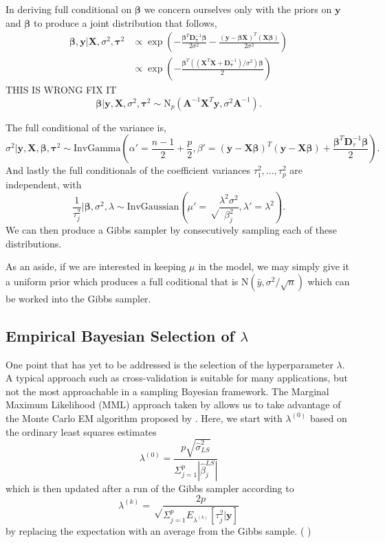 \documentclass{uwstat572}
\newcommand{\vmcomment}[1]{({\color{blue}{VM's comment:}} \textbf{\color{blue}{#1}})}
\begin{document}
In deriving full conditional on $\boldsymbol\beta$ we concern ourselves only with the priors on $\mathbf{y}$ and $\boldsymbol\beta$ to produce a joint distribution that follows,\begin{align*}
\boldsymbol\beta,\mathbf{y}|\mathbf{X},\sigma^2,\boldsymbol\tau^2 &\propto \exp{\left(-\frac{\boldsymbol\beta^T\mathbf{D}_{\boldsymbol\tau}^{-1}\boldsymbol\beta}{2\sigma^2}-\frac{(\mathbf{y}-\boldsymbol\beta\mathbf{X})^T(\mathbf{X}\boldsymbol\beta)}{2\sigma^2}\right)}\\
&\propto \exp{\left(-\frac{\boldsymbol\beta^T((\mathbf{X}^T\mathbf{X}+\mathbf{D}_{\boldsymbol\tau}^{-1})/\sigma^2)\boldsymbol\beta}{2}\right)}
\end{align*}
THIS IS WRONG FIX IT
\[
\boldsymbol\beta|\mathbf{y},\mathbf{X},\sigma^2,\boldsymbol\tau^2 \sim \text{N}_p(\mathbf{A}^{-1}\mathbf{X}^T\mathbf{y},\sigma^2\mathbf{A}^{-1}). \] 

The full conditional of the variance is, \[ \sigma^2|\mathbf{y},\mathbf{X},\boldsymbol\beta,\boldsymbol\tau^2 \sim \text{InvGamma}\left(\alpha'=\frac{n-1}{2}+\frac{p}{2},\beta'=(\mathbf{y}-\mathbf{X}\boldsymbol\beta)^T(\mathbf{y}-\mathbf{X}\boldsymbol\beta)+\frac{\boldsymbol\beta^T\mathbf{D}_\tau^{-1}\boldsymbol\beta}{2}\right). \] And lastly the full conditionals of the coefficient variances $\tau^2_1,...,\tau^2_p$ are independent, with \[
\frac{1}{\tau_j^2} | \boldsymbol\beta, \sigma^2, \lambda \sim \text{InvGaussian}\left(\mu'=\sqrt\frac{\lambda^2\sigma^2}{\beta_j^2}, \lambda'=\lambda^2\right). \] We can then produce a Gibbs sampler by consecutively sampling each of these distributions.

As an aside, if we are interested in keeping $\mu$ in the model, we may simply give it a uniform prior which produces a full coditional that is $\text{N}(\bar{y},\sigma^2/\sqrt{n})$ which can be worked into the Gibbs sampler.

\subsection{Empirical Bayesian Selection of $\lambda$}
One point that has yet to be addressed is the selection of the hyperparameter $\lambda$. A typical approach such as cross-validation is suitable for many applications, but not the most approachable in a sampling Bayesian framework. The Marginal Maximum Likelihood (MML) approach taken by \cite{park2008bayesian} allows us to take advantage of the Monte Carlo EM algorithm proposed by \cite{casella2001empirical}. Here, we start with $\lambda^{(0)}$ based on the ordinary least squares estimates \[ 
\lambda^{(0)}=\frac{p\sqrt{\hat\sigma^2_{LS}}}{\Sigma^p_{j=1}|\hat\beta_j^{LS}|} 
\] which is then updated after a run of the Gibbs sampler according to \[ 
\lambda^{(k)}=\sqrt\frac{2p}{\Sigma^p_{j=1}E_{\lambda^{(k)}}[\tau^2_j|\mathbf{y}]}
\] by replacing the expectation with an average from the Gibbs sample. 
\vmcomment{Not clear why this is an EM Algorithm.}
\end{document}
